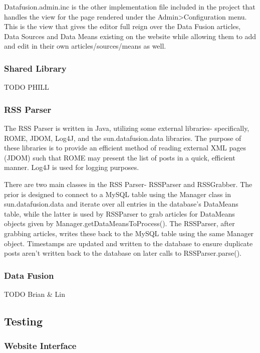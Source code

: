 \documentclass[11pt]{article} %
\begin{document}
Datafusion.admin.inc is the other implementation file included in the project that handles the view for the page rendered under the Admin>Configuration menu. This is the view that gives the editor full reign over the Data Fusion articles, Data Sources and Data Means existing on the website while allowing them to add and edit in their own articles/sources/means as well.

\subsubsection{Shared Library}

TODO PHILL

\subsubsection{RSS Parser}

The RSS Parser is written in Java, utilizing some external libraries- specifically, ROME, JDOM, Log4J, and the sun.datafusion.data libraries. The purpose of these libraries is to provide an efficient method of reading external XML pages (JDOM) such that ROME may present the list of posts in a quick, efficient manner. Log4J is used for logging purposes.

There are two main classes in the RSS Parser- RSSParser and RSSGrabber. The prior is designed to connect to a MySQL table using the Manager class in sun.datafusion.data and iterate over all entries in the database’s DataMeans table, while the latter is used by RSSParser to grab articles for DataMeans objects given by Manager.getDataMeansToProcess(). The RSSParser, after grabbing articles, writes these back to the MySQL table using the same Manager object. Timestamps are updated and written to the database to ensure duplicate posts aren’t written back to the database on later calls to RSSParser.parse().

\subsubsection{Data Fusion}

TODO Brian \& Lin

\subsection{Testing}

\subsubsection{Website Interface}
\end{document}
